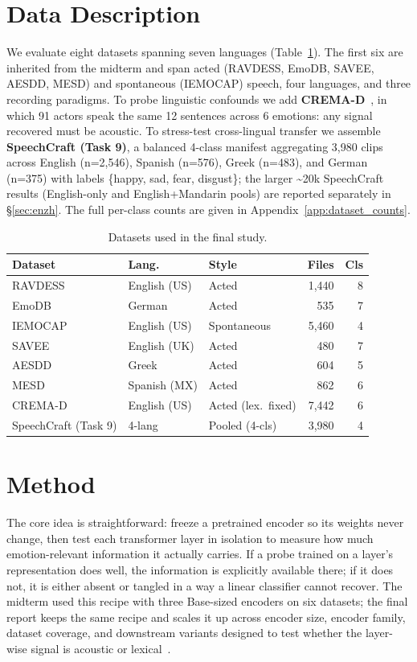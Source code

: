 \documentclass[sigconf,screen]{acmart}
\begin{document}
\section{Data Description}
We evaluate eight datasets spanning seven languages (Table~\ref{tab:datasets}). The first six are inherited from the midterm and span acted (RAVDESS, EmoDB, SAVEE, AESDD, MESD) and spontaneous (IEMOCAP) speech, four languages, and three recording paradigms. To probe linguistic confounds we add \textbf{CREMA-D}~\cite{cao2014crema}, in which 91 actors speak the same 12 sentences across 6 emotions: any signal recovered must be acoustic. To stress-test cross-lingual transfer we assemble \textbf{SpeechCraft (Task 9)}, a balanced 4-class manifest aggregating 3{,}980 clips across English (n=2{,}546), Spanish (n=576), Greek (n=483), and German (n=375) with labels \{happy, sad, fear, disgust\}; the larger \textasciitilde20k SpeechCraft results (English-only and English+Mandarin pools) are reported separately in \S\ref{sec:enzh}. The full per-class counts are given in Appendix~\ref{app:dataset_counts}.
\begin{table}[h]
\centering
\small
\caption{Datasets used in the final study.}
\label{tab:datasets}
\setlength{\tabcolsep}{4pt}
\begin{tabular}{lllrr}
\toprule
\textbf{Dataset} & \textbf{Lang.} & \textbf{Style} & \textbf{Files} & \textbf{Cls} \\
\midrule
RAVDESS  & English (US)  & Acted        & 1{,}440  & 8 \\
EmoDB    & German        & Acted        & 535      & 7 \\
IEMOCAP  & English (US)  & Spontaneous  & 5{,}460  & 4 \\
SAVEE    & English (UK)  & Acted        & 480      & 7 \\
AESDD    & Greek         & Acted        & 604      & 5 \\
MESD     & Spanish (MX)  & Acted        & 862      & 6 \\
CREMA-D  & English (US)  & Acted (lex.\ fixed) & 7{,}442 & 6 \\
SpeechCraft (Task 9) & 4-lang  & Pooled (4-cls)  & 3{,}980 & 4 \\
\bottomrule
\end{tabular}
\end{table}
\section{Method}
\label{sec:method}
The core idea is straightforward: freeze a pretrained encoder so its weights never change, then test each transformer layer in isolation to measure how much emotion-relevant information it actually carries. If a probe trained on a layer's representation does well, the information is explicitly available there; if it does not, it is either absent or tangled in a way a linear classifier cannot recover. The midterm used this recipe with three Base-sized encoders on six datasets; the final report keeps the same recipe and scales it up across encoder size, encoder family, dataset coverage, and downstream variants designed to test whether the layer-wise signal is acoustic or lexical~\cite{triantafyllopoulos2022probing,shah2021audio,pasad2021layer}.
\end{document}
